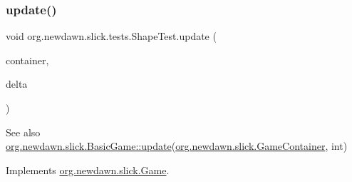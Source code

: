 \subsubsection{\texorpdfstring{update()}{update()}}
{\footnotesize\ttfamily void org.\+newdawn.\+slick.\+tests.\+Shape\+Test.\+update (\begin{DoxyParamCaption}\item[{\mbox{\hyperlink{classorg_1_1newdawn_1_1slick_1_1_game_container}{Game\+Container}}}]{container,  }\item[{int}]{delta }\end{DoxyParamCaption})\hspace{0.3cm}{\ttfamily [inline]}}

\begin{DoxySeeAlso}{See also}
\mbox{\hyperlink{classorg_1_1newdawn_1_1slick_1_1_basic_game_acfe6fa05aef83bff1631af91a3e4bd20}{org.\+newdawn.\+slick.\+Basic\+Game\+::update}}(\mbox{\hyperlink{classorg_1_1newdawn_1_1slick_1_1_game_container}{org.\+newdawn.\+slick.\+Game\+Container}}, int) 
\end{DoxySeeAlso}


Implements \mbox{\hyperlink{interfaceorg_1_1newdawn_1_1slick_1_1_game_ab07b2e9463ee4631620dde0de25bdee8}{org.\+newdawn.\+slick.\+Game}}.


